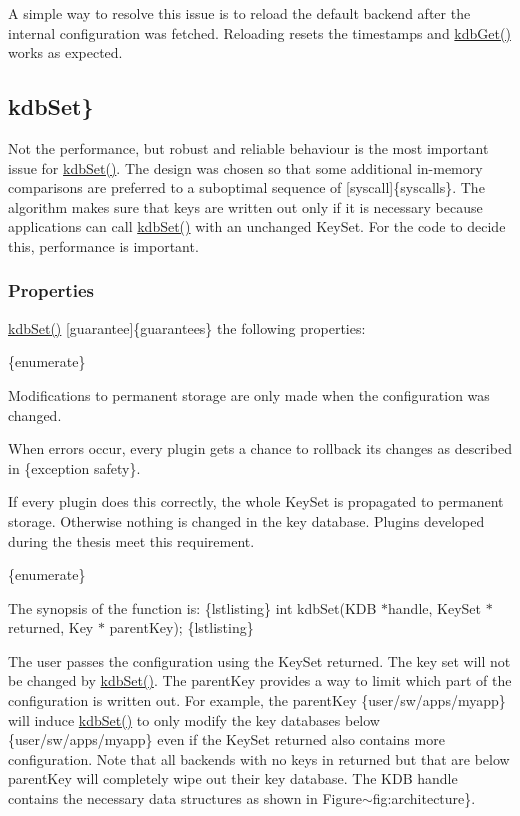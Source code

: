 A simple way to resolve this issue is to reload the default backend after the internal configuration was fetched. Reloading resets the timestamps and {\ttfamily \hyperlink{group__kdb_ga28e385fd9cb7ccfe0b2f1ed2f62453a1}{kdb\+Get()}} works as expected.

\subsection*{kdb\+Set\}}

Not the performance, but robust and reliable behaviour is the most important issue for {\ttfamily \hyperlink{group__kdb_ga11436b058408f83d303ca5e996832bcf}{kdb\+Set()}}. The design was chosen so that some additional in-\/memory comparisons are preferred to a suboptimal sequence of \mbox{[}syscall\mbox{]}\{syscalls\}. The algorithm makes sure that keys are written out only if it is necessary because applications can call {\ttfamily \hyperlink{group__kdb_ga11436b058408f83d303ca5e996832bcf}{kdb\+Set()}} with an unchanged {\ttfamily Key\+Set}. For the code to decide this, performance is important.

\subsubsection*{Properties}

{\ttfamily \hyperlink{group__kdb_ga11436b058408f83d303ca5e996832bcf}{kdb\+Set()}} \mbox{[}guarantee\mbox{]}\{guarantees\} the following properties\+:

\{enumerate\}

Modifications to permanent storage are only made when the configuration was changed.

When errors occur, every plugin gets a chance to rollback its changes as described in \{exception safety\}.

If every plugin does this correctly, the whole {\ttfamily Key\+Set} is propagated to permanent storage. Otherwise nothing is changed in the key database. Plugins developed during the thesis meet this requirement.

\{enumerate\}

The synopsis of the function is\+: \{lstlisting\} int kdb\+Set(K\+D\+B $\ast$handle, Key\+Set $\ast$returned, Key $\ast$ parent\+Key); \{lstlisting\}

The user passes the configuration using the {\ttfamily Key\+Set} {\ttfamily returned}. The key set will not be changed by {\ttfamily \hyperlink{group__kdb_ga11436b058408f83d303ca5e996832bcf}{kdb\+Set()}}. The {\ttfamily parent\+Key} provides a way to limit which part of the configuration is written out. For example, the {\ttfamily parent\+Key} \{user/sw/apps/myapp\} will induce {\ttfamily \hyperlink{group__kdb_ga11436b058408f83d303ca5e996832bcf}{kdb\+Set()}} to only modify the key databases below \{user/sw/apps/myapp\} even if the {\ttfamily Key\+Set} {\ttfamily returned} also contains more configuration. Note that all backends with no keys in {\ttfamily returned} but that are below {\ttfamily parent\+Key} will completely wipe out their key database. The {\ttfamily K\+D\+B} handle contains the necessary data structures as shown in Figure$\sim$fig\+:architecture\}.

